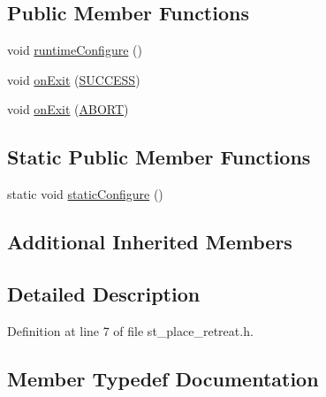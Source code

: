 \subsection*{Public Member Functions}
\begin{DoxyCompactItemize}
\item 
void \hyperlink{structsm__moveit__wine__serve_1_1StPlaceRetreat_a9067d8c240c29a631b2081a16981f853}{runtime\+Configure} ()
\item 
void \hyperlink{structsm__moveit__wine__serve_1_1StPlaceRetreat_a5ad3c6c22499c5853f73dcb1d9009bf2}{on\+Exit} (\hyperlink{structsmacc_1_1default__transition__tags_1_1SUCCESS}{S\+U\+C\+C\+E\+SS})
\item 
void \hyperlink{structsm__moveit__wine__serve_1_1StPlaceRetreat_aece538e80864c13b6231f6e03425e454}{on\+Exit} (\hyperlink{structsmacc_1_1default__transition__tags_1_1ABORT}{A\+B\+O\+RT})
\end{DoxyCompactItemize}
\subsection*{Static Public Member Functions}
\begin{DoxyCompactItemize}
\item 
static void \hyperlink{structsm__moveit__wine__serve_1_1StPlaceRetreat_a503dfbc3f54c460334db3750f4c31b57}{static\+Configure} ()
\end{DoxyCompactItemize}
\subsection*{Additional Inherited Members}


\subsection{Detailed Description}


Definition at line 7 of file st\+\_\+place\+\_\+retreat.\+h.



\subsection{Member Typedef Documentation}
\mbox{\label{structsm__moveit__wine__serve_1_1StPlaceRetreat_ad79f082a8f181baac1ca456c08b70b0f}} 

